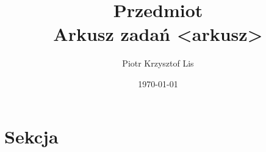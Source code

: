 \documentclass[12pt, chapterprefix=true]{report}
\title{\Huge{Przedmiot \\ Arkusz zadań <arkusz>}}
\author{\huge{Piotr Krzysztof Lis}}
\date{\today}
\begin{document}
\maketitle
\newpage
{}

\renewcommand*\contentsname{Spis zadań}
\renewcommand{\figurename}{Ryc.}
\tableofcontents

\pagebreak
\chapter{Sekcja}
\end{document}
